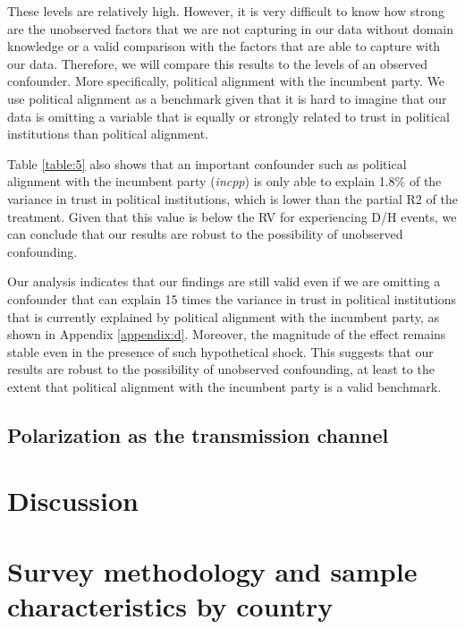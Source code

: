 \documentclass{article}
\begin{document}
These levels are relatively high. However, it is very difficult to know how strong are the unobserved factors that we are not capturing in our data without domain knowledge or a valid comparison with the factors that are able to capture with our data. Therefore, we will compare this results to the levels of an observed confounder. More specifically, political alignment with the incumbent party. We use political alignment as a benchmark given that it is hard to imagine that our data is omitting a variable that is equally or strongly related to trust in political institutions than political alignment. 

Table \ref{table:5} also shows that an important confounder such as political alignment with the incumbent party (\emph{incpp}) is only able to explain 1.8\% of the variance in trust in political institutions, which is lower than the partial R2 of the treatment. Given that this value is below the RV for experiencing D/H events, we can conclude that our results are robust to the possibility of unobserved confounding.



Our analysis indicates that our findings are still valid even if we are omitting a confounder that can explain 15 times the variance in trust in political institutions that is currently explained by political alignment with the incumbent party, as shown in Appendix \ref{appendix:d}. Moreover, the magnitude of the effect remains stable even in the presence of such hypothetical shock. This suggests that our results are robust to the possibility of unobserved confounding, at least to the extent that political alignment with the incumbent party is a valid benchmark.

\subsection{Polarization as the transmission channel}

\section{Discussion}

\newpage
\appendix
\section{Survey methodology and sample characteristics by country}
\label{appendix:a}

\end{document}
